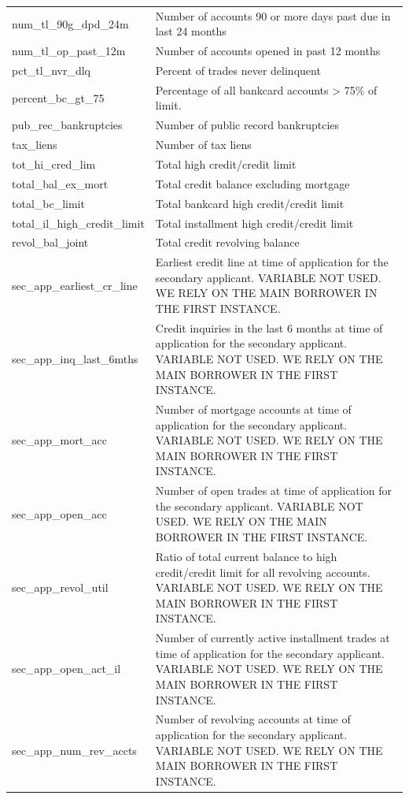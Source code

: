 \documentclass[11pt,]{report}
\begin{document}
\begin{longtable}[t]{>{\raggedright\arraybackslash}p{7cm}>{\raggedright\arraybackslash}p{7cm}}
num\_tl\_90g\_dpd\_24m & Number of accounts 90 or more days past due in last 24 months\\
\addlinespace
num\_tl\_op\_past\_12m & Number of accounts opened in past 12 months\\
pct\_tl\_nvr\_dlq & Percent of trades never delinquent\\
percent\_bc\_gt\_75 & Percentage of all bankcard accounts > 75\% of limit.\\
pub\_rec\_bankruptcies & Number of public record bankruptcies\\
tax\_liens & Number of tax liens\\
\addlinespace
tot\_hi\_cred\_lim & Total high credit/credit limit\\
total\_bal\_ex\_mort & Total credit balance excluding mortgage\\
total\_bc\_limit & Total bankcard high credit/credit limit\\
total\_il\_high\_credit\_limit & Total installment high credit/credit limit\\
revol\_bal\_joint & Total credit revolving balance\\
\addlinespace
sec\_app\_earliest\_cr\_line & Earliest credit line at time of application for the secondary applicant. VARIABLE NOT USED. WE RELY ON THE MAIN BORROWER IN THE FIRST INSTANCE.\\
sec\_app\_inq\_last\_6mths & Credit inquiries in the last 6 months at time of application for the secondary applicant. VARIABLE NOT USED. WE RELY ON THE MAIN BORROWER IN THE FIRST INSTANCE.\\
sec\_app\_mort\_acc & Number of mortgage accounts at time of application for the secondary applicant. VARIABLE NOT USED. WE RELY ON THE MAIN BORROWER IN THE FIRST INSTANCE.\\
sec\_app\_open\_acc & Number of open trades at time of application for the secondary applicant. VARIABLE NOT USED. WE RELY ON THE MAIN BORROWER IN THE FIRST INSTANCE.\\
sec\_app\_revol\_util & Ratio of total current balance to high credit/credit limit for all revolving accounts. VARIABLE NOT USED. WE RELY ON THE MAIN BORROWER IN THE FIRST INSTANCE.\\
\addlinespace
sec\_app\_open\_act\_il & Number of currently active installment trades at time of application for the secondary applicant. VARIABLE NOT USED. WE RELY ON THE MAIN BORROWER IN THE FIRST INSTANCE.\\
sec\_app\_num\_rev\_accts & Number of revolving accounts at time of application for the secondary applicant. VARIABLE NOT USED. WE RELY ON THE MAIN BORROWER IN THE FIRST INSTANCE.\\

\end{longtable}
\end{document}
